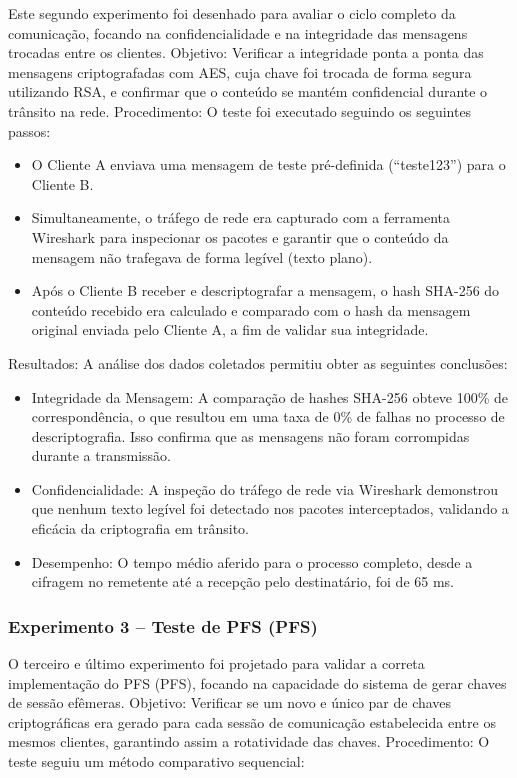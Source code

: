 Este segundo experimento foi desenhado para avaliar o ciclo completo
da comunicação, focando na confidencialidade e na integridade das
mensagens trocadas entre os clientes. Objetivo: Verificar a
integridade ponta a ponta das mensagens criptografadas com \acs{AES}, cuja
chave foi trocada de forma segura utilizando \acs{RSA}, e confirmar que o
conteúdo se mantém confidencial durante o trânsito na rede.
Procedimento: O teste foi executado seguindo os seguintes passos:

\begin{itemize}
  \item O Cliente A enviava uma mensagem de teste pré-definida
    (“teste123”) para o Cliente B.
  \item Simultaneamente, o tráfego de rede era capturado com a
    ferramenta Wireshark para inspecionar os pacotes e garantir que o
    conteúdo da mensagem não trafegava de forma legível (texto plano).
  \item Após o Cliente B receber e descriptografar a mensagem, o hash
    SHA-256 do conteúdo recebido era calculado e comparado com o hash
    da mensagem original enviada pelo Cliente A, a fim de validar sua
    integridade.
\end{itemize}

Resultados: A análise dos dados coletados permitiu obter as seguintes
conclusões:

\begin{itemize}
  \item Integridade da Mensagem: A comparação de hashes SHA-256
    obteve 100\% de correspondência, o que resultou em uma taxa de 0\%
    de falhas no processo de descriptografia. Isso confirma que as
    mensagens não foram corrompidas durante a transmissão.
  \item Confidencialidade: A inspeção do tráfego de rede via
    Wireshark demonstrou que nenhum texto legível foi detectado nos
    pacotes interceptados, validando a eficácia da criptografia em trânsito.
  \item Desempenho: O tempo médio aferido para o processo completo,
    desde a cifragem no remetente até a recepção pelo destinatário,
    foi de 65 ms.
\end{itemize}

\subsubsection{Experimento 3 – Teste de \acl{PFS} (\acs{PFS})}

O terceiro e último experimento foi projetado para validar a correta
implementação do \acl{PFS} (\acs{PFS}), focando na capacidade
do sistema de gerar chaves de sessão efêmeras. Objetivo: Verificar se
um novo e único par de chaves criptográficas era gerado para cada
sessão de comunicação estabelecida entre os mesmos clientes,
garantindo assim a rotatividade das chaves. Procedimento: O teste
seguiu um método comparativo sequencial:

